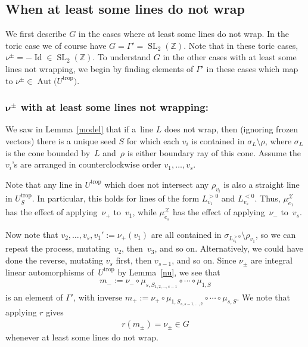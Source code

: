 \documentclass[10pt,a4paper]{amsart}
\numberwithin{equation}{section}
\numberwithin{figure}{section}
\numberwithin{table}{section}
\DeclareMathOperator{\Id}{Id}
\DeclareMathOperator{\SL}{SL}
\DeclareMathOperator{\trop}{trop}
\DeclareMathOperator{\Aut}{Aut}
\let\bb=\mathbb
\let\s=\mathcal
\theoremstyle{definition}
\begin{document}
\subsection{When at least some lines do not wrap}\label{Auto-no-wrap}
We first describe $G$ in the cases where at least some lines do not wrap. In the toric case we of course have $G=\Gamma'=\SL_2(\bb{Z})$. Note that in these toric cases, $\nu^{\pm}=-\Id\in \SL_2(\bb{Z})$. To understand $G$ in the other cases with at least some lines not wrapping, we begin by finding elements of $\Gamma'$ in these cases which map to $\nu^{\pm}\in \Aut\big(U^{\trop}\big)$.

\subsubsection[$\nu^{\pm}$ with at least some lines not wrapping:]{$\boldsymbol{\nu^{\pm}}$ with at least some lines not wrapping:} We saw in Lemma~\ref{model} that if a~line $L$ does not wrap, then (ignoring frozen vectors) there is a unique seed $S$ for which each $v_i$ is contained in $\sigma_L\setminus \rho$, where $\sigma_L$ is the cone bounded by~$L$ and~$\rho$ is either boundary ray of this cone. Assume the $v_i$'s are arranged in counterclockwise order $v_1,\dots,v_s$.

Note that any line in $U^{\trop}$ which does not intersect any $\rho_{v_i}$ is also a straight line in $U^{\trop}_S$. In particular, this holds for lines of the form $L_{v_1}^{>0}$ and $L_{v_s}^{<0}$. Thus, $\mu_{e_1}^{\s{X}}$ has the effect of applying~$\nu_+$ to~$v_1$, while $\mu_{e_s}^{\s{X}}$ has the effect of applying~$\nu_-$ to~$v_s$.

Now note that $v_2,\dots,v_s,v_1':=\nu_+(v_1)$ are all contained in $\sigma_{L_{v_1}^{>0}}\setminus \rho_{v_1}$, so we can repeat the process, mutating~$v_2$, then~$v_3$, and so on. Alternatively, we could have done the reverse, mutating $v_s$ first, then $v_{s-1}$, and so on. Since $\nu_{\pm}$ are integral linear automorphisms of~$U^{\trop}$ by Lemma~\ref{nu}, we see that
\begin{gather}\label{m-}
 m_-:=\nu_{-} \circ \mu_{s,S_{1,2,\dots,s-1}}\circ \cdots \circ \mu_{1,S}
\end{gather} is an element of $\Gamma'$, with inverse $m_+:=\nu_+ \circ \mu_{1,S_{s,s-1,\dots,2}}\circ\cdots\circ \mu_{s,S}$. We note that applying $r$ gives
\begin{gather*}
 r(m_{\pm}) = \nu_{\pm}\in G
\end{gather*}
whenever at least some lines do not wrap.
\end{document}
